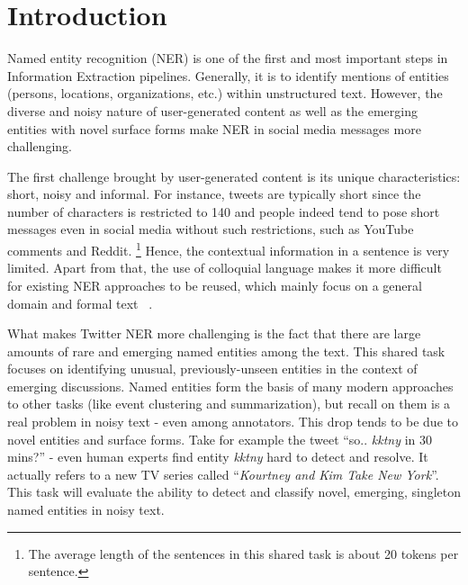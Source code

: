 \section{Introduction}
\label{sec:intro}
Named entity recognition (NER) is one of the first and most important steps in Information Extraction pipelines. 
Generally, it is to identify mentions of entities (persons, locations, organizations, etc.)
within unstructured text. 
However, the diverse and noisy nature of user-generated content as well as the emerging entities with novel surface forms make NER in social media messages more challenging.

The first challenge brought by user-generated content
is its unique characteristics: short, noisy and informal. 
For instance, tweets are typically short since the number of characters is restricted to 140 and people indeed tend to pose short messages even in social media without such restrictions, such as YouTube comments and Reddit.
\footnote{The average length of the sentences in this shared task is about 20 tokens per sentence.}
Hence, the contextual information in a sentence is very limited.
Apart from that, 
the use of colloquial language makes it more difficult for existing NER approaches to be reused, which mainly focus on a general domain and formal text ~\cite{baldwin2015shared, derczynski2015analysis}. 

What makes Twitter NER more challenging is the fact that there are large amounts of rare and emerging named entities among the text.
This shared task focuses on identifying unusual, previously-unseen entities in the context of emerging discussions. Named entities form the basis of many modern approaches to other tasks (like event clustering and summarization), but recall on them is a real problem in noisy text - even among annotators. This drop tends to be due to novel entities and surface forms. Take for example the tweet ``so.. \textit{kktny} in 30 mins?'' - even human experts find entity \textit{kktny} hard to detect and resolve. It actually refers to a new TV series called ``\textit{Kourtney and Kim Take New York}''. This task will evaluate the ability to detect and classify novel, emerging, singleton named entities in noisy text.

